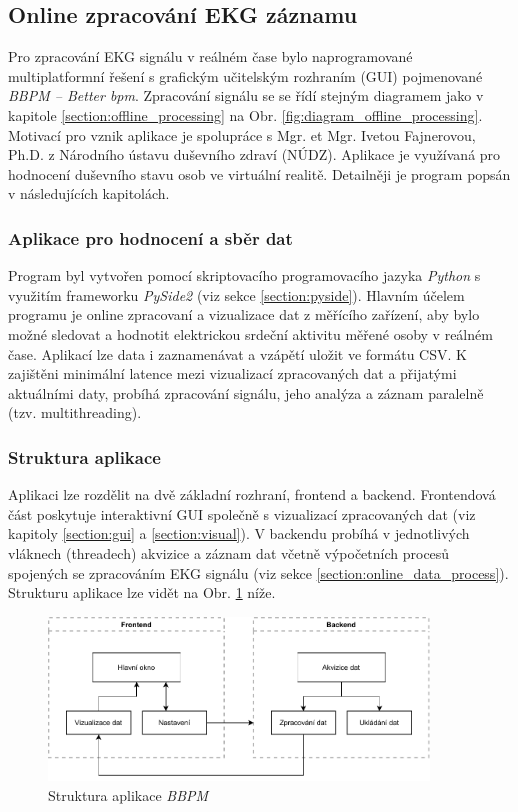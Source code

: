 \subsection{Online zpracování EKG záznamu}
\label{section:online_processing}
Pro zpracování EKG signálu v reálném čase bylo naprogramované multiplatformní
řešení s grafickým učitelským rozhraním (GUI) pojmenované \textit{BBPM -- Better
bpm}. Zpracování signálu se se řídí stejným diagramem jako v kapitole
\ref{section:offline_processing} na Obr. \ref{fig:diagram_offline_processing}.
Motivací pro vznik aplikace je spolupráce s Mgr. et Mgr. Ivetou Fajnerovou,
Ph.D. z Národního ústavu duševního zdraví (NÚDZ). Aplikace je využívaná pro
hodnocení duševního stavu osob ve virtuální realitě. Detailněji je program
popsán v následujících kapitolách.

\subsubsection{Aplikace pro hodnocení a sběr dat}
Program byl vytvořen pomocí skriptovacího programovacího jazyka \textit{Python}
\cite{python} s využitím frameworku \textit{PySide2} (viz sekce
\ref{section:pyside}). Hlavním účelem programu je online zpracovaní a
vizualizace dat z měřícího zařízení, aby bylo možné sledovat a hodnotit
elektrickou srdeční aktivitu měřené osoby v reálném čase. Aplikací lze data i
zaznamenávat a vzápětí uložit ve formátu CSV. K zajištěni minimální latence mezi
vizualizací zpracovaných dat a přijatými aktuálními daty, probíhá zpracování
signálu, jeho analýza a záznam paralelně (tzv. multithreading).

\subsubsection{Struktura aplikace}
Aplikaci lze rozdělit na dvě základní rozhraní, frontend a backend. Frontendová
část poskytuje interaktivní GUI společně s vizualizací zpracovaných dat (viz
kapitoly \ref{section:gui} a \ref{section:visual}). V backendu probíhá v
jednotlivých vláknech (threadech) akvizice a záznam dat včetně výpočetních
procesů spojených se zpracováním EKG signálu (viz sekce
\ref{section:online_data_process}). Strukturu aplikace lze vidět na Obr.
\ref{fig:app_structure} níže.

\begin{figure}[h]
    \begin{center}
        \includegraphics[width=0.9\textwidth]{../assets/diagrams/app_structure}
        \caption{Struktura aplikace \textit{BBPM}}
        \label{fig:app_structure}
    \end{center}
\end{figure}

